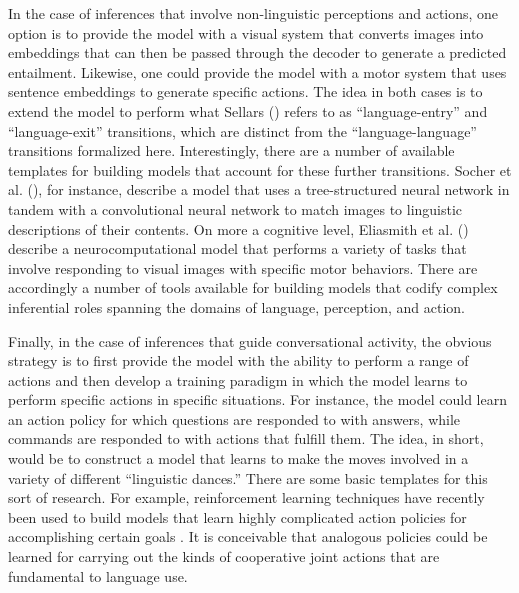 In the case of inferences that involve non-linguistic perceptions and actions, one option is to provide the model with a visual system that converts images into embeddings that can then be passed through the decoder to generate a predicted entailment. Likewise, one could provide the model with a motor system that uses sentence embeddings to generate specific actions. The idea in both cases is to extend the model to perform what Sellars (\citeyear{Sellars:1953}) refers to as ``language-entry'' and ``language-exit'' transitions, which are distinct from the ``language-language'' transitions formalized here. Interestingly, there are a number of available templates for building models that account for these further transitions. Socher et al. (\citeyear{Socher:2014}), for instance, describe a model that uses a tree-structured neural network in tandem with a convolutional neural network to match images to linguistic descriptions of their contents. On more a cognitive level, Eliasmith et al. (\citeyear{Eliasmith:2012}) describe a neurocomputational model that performs a variety of tasks that involve responding to visual images with specific motor behaviors. There are accordingly a number of tools available for building models that codify complex inferential roles spanning the domains of language, perception, and action. 

Finally, in the case of inferences that guide conversational activity, the obvious strategy is to first provide the model with the ability to perform a range of actions and then develop a training paradigm in which the model learns to perform specific actions in specific situations. For instance, the model could learn an action policy for which questions are responded to with answers, while commands are responded to with actions that fulfill them. The idea, in short, would be to construct a model that learns to make the moves involved in a variety of different ``linguistic dances.'' There are some basic templates for this sort of research. For example, reinforcement learning techniques have recently been used to build models that learn highly complicated action policies for accomplishing certain goals \citep{Mnih:2015}. It is conceivable that analogous policies could be learned for carrying out the kinds of cooperative joint actions that are fundamental to language use.

